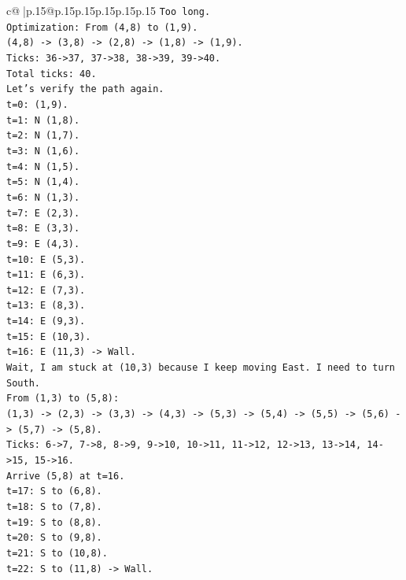 \documentclass{article}
\begin{document}
{\begin{supertabular}{c@{$\;$}|p{.15\linewidth}@{}p{.15\linewidth}p{.15\linewidth}p{.15\linewidth}p{.15\linewidth}p{.15\linewidth}}
{{{\texttt{Too long.} \\
\texttt{Optimization: From (4,8) to (1,9).} \\
\texttt{(4,8) {-}> (3,8) {-}> (2,8) {-}> (1,8) {-}> (1,9).} \\
\texttt{Ticks: 36{-}>37, 37{-}>38, 38{-}>39, 39{-}>40.} \\
\texttt{Total ticks: 40.} \\
\texttt{Let's verify the path again.} \\
\texttt{t=0: (1,9).} \\
\texttt{t=1: N (1,8).} \\
\texttt{t=2: N (1,7).} \\
\texttt{t=3: N (1,6).} \\
\texttt{t=4: N (1,5).} \\
\texttt{t=5: N (1,4).} \\
\texttt{t=6: N (1,3).} \\
\texttt{t=7: E (2,3).} \\
\texttt{t=8: E (3,3).} \\
\texttt{t=9: E (4,3).} \\
\texttt{t=10: E (5,3).} \\
\texttt{t=11: E (6,3).} \\
\texttt{t=12: E (7,3).} \\
\texttt{t=13: E (8,3).} \\
\texttt{t=14: E (9,3).} \\
\texttt{t=15: E (10,3).} \\
\texttt{t=16: E (11,3) {-}> Wall.} \\
\texttt{Wait, I am stuck at (10,3) because I keep moving East. I need to turn South.} \\
\texttt{From (1,3) to (5,8):} \\
\texttt{(1,3) {-}> (2,3) {-}> (3,3) {-}> (4,3) {-}> (5,3) {-}> (5,4) {-}> (5,5) {-}> (5,6) {-}> (5,7) {-}> (5,8).} \\
\texttt{Ticks: 6{-}>7, 7{-}>8, 8{-}>9, 9{-}>10, 10{-}>11, 11{-}>12, 12{-}>13, 13{-}>14, 14{-}>15, 15{-}>16.} \\
\texttt{Arrive (5,8) at t=16.} \\
\texttt{t=17: S to (6,8).} \\
\texttt{t=18: S to (7,8).} \\
\texttt{t=19: S to (8,8).} \\
\texttt{t=20: S to (9,8).} \\
\texttt{t=21: S to (10,8).} \\
\texttt{t=22: S to (11,8) {-}> Wall.} \\
}}}
\end{supertabular}}
\end{document}
